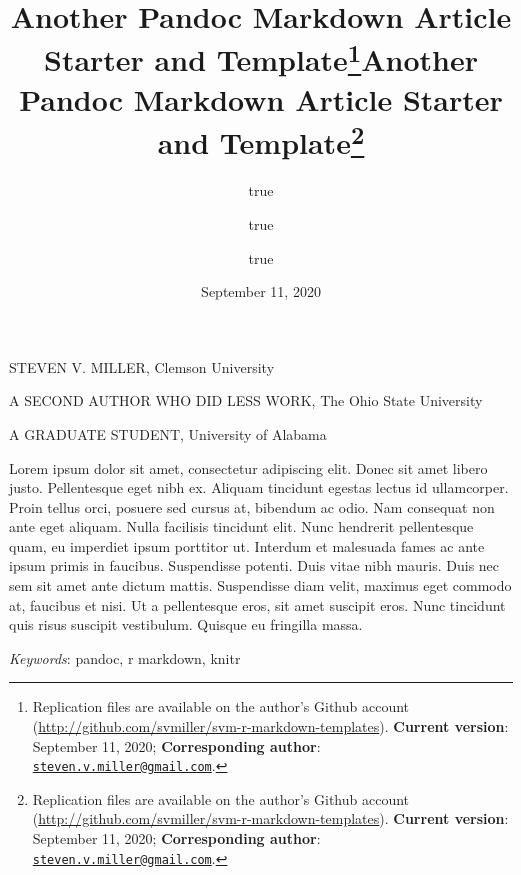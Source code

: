 \documentclass[
      11pt,
                      ]{article}
\title{Another Pandoc Markdown Article
Starter and Template\thanks{Replication files are available on the
author's Github account
(\url{http://github.com/svmiller/svm-r-markdown-templates}).
\textbf{Current version}: September 11, 2020; \textbf{Corresponding
author}:
\href{mailto:steven.v.miller@gmail.com}{\nolinkurl{steven.v.miller@gmail.com}}.}}
\author{true \and true \and true}
\date{September 11, 2020}
\title{Another Pandoc Markdown
Article Starter and Template\thanks{Replication files are available on
the author's Github account
(\url{http://github.com/svmiller/svm-r-markdown-templates}).
\textbf{Current version}: September 11, 2020; \textbf{Corresponding
author}:
\href{mailto:steven.v.miller@gmail.com}{\nolinkurl{steven.v.miller@gmail.com}}.}  }
\date{}
\renewenvironment{abstract}
                  {{%
                    \setlength{\leftmargin}{0mm}
                    \setlength{\rightmargin}{\leftmargin}%
                  }%
                    \relax}
                  {\endlist}
\begin{document}



{%
\setlength{\parindent}{0pt}
\thispagestyle{plain}
{%
\maketitle  %

}




{
   \vskip 13.5pt\relax \normalsize\fontsize{11}{12} 
   \MakeUppercase{\textsf{\large Steven V. Miller}}, \small{Clemson
University}   \par \MakeUppercase{\textsf{\large A Second Author Who Did
Less Work}}, \small{The Ohio State
University}   \par \MakeUppercase{\textsf{\large A Graduate
Student}}, \small{University of Alabama}   

}

}








\begin{abstract}


    \vskip 8.5pt %

\noindent \small{Lorem ipsum dolor sit amet, consectetur adipiscing
elit. Donec sit amet libero justo. Pellentesque eget nibh ex. Aliquam
tincidunt egestas lectus id ullamcorper. Proin tellus orci, posuere sed
cursus at, bibendum ac odio. Nam consequat non ante eget aliquam. Nulla
facilisis tincidunt elit. Nunc hendrerit pellentesque quam, eu imperdiet
ipsum porttitor ut. Interdum et malesuada fames ac ante ipsum primis in
faucibus. Suspendisse potenti. Duis vitae nibh mauris. Duis nec sem sit
amet ante dictum mattis. Suspendisse diam velit, maximus eget commodo
at, faucibus et nisi. Ut a pellentesque eros, sit amet suscipit eros.
Nunc tincidunt quis risus suscipit vestibulum. Quisque eu fringilla
massa.}


\vskip 8.5pt \noindent \emph{Keywords}: pandoc, r markdown, knitr \par




\end{abstract}


\vskip -8.5pt




\setlength{\parindent}{16pt}
\setlength{\parskip}{0pt}
\end{document}
